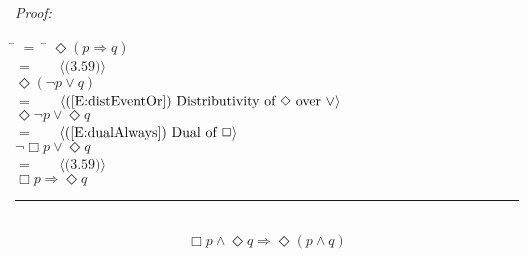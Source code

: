 \documentclass[fleqn, leqno]{article}
\newcommand{\lgap}{2pt}                             %
\newcommand{\mymathindent}{24pt}                    %
\newcommand{\Event}{\Diamond}
\newcommand{\Always}{\Box}
\newcommand{\myqed}{\hfill\rule[-.23ex]{1.2ex}{2.0ex}}
\newcommand{\Gll} {\langle}                         %
\newcommand{\Ggg} {\rangle}                         %
\newcommand{\Hint}[1]     {\ \ \ $\Gll              \mbox{#1} \Ggg$ }   %
\begin{document}
\emph{Proof:}
\begin{tabbing}
\hspace{\mymathindent} \= $= \;$ \= \kill
  \> \>   $\Event(p \Rightarrow q)$\\[\lgap]
  \> $=$  \>  \Hint{(3.59)}\\[\lgap]
  \> \>   $\Event(\lnot p \lor q)$\\[\lgap]
  \> $=$  \>  \Hint{(\ref{E:distEventOr}) Distributivity of $\Event$ over $\lor$}\\[\lgap]
  \> \>   $\Event\lnot p \lor \Event q$\\[\lgap]
  \> $=$  \>  \Hint{(\ref{E:dualAlways}) Dual of $\Always$}\\[\lgap]
  \> \>   $\lnot\Always p \lor \Event q$\\[\lgap]
  \> $=$  \>  \Hint{(3.59)}\\[\lgap]
  \> \>   $\Always p \Rightarrow \Event q$\\[\lgap]  
\end{tabbing}
\myqed\\[\lgap]


\begin{equation}\label{E:alwaysAndEvent}
\Always p \land \Event q \Rightarrow \Event (p \land q)
\end{equation}
\end{document}
